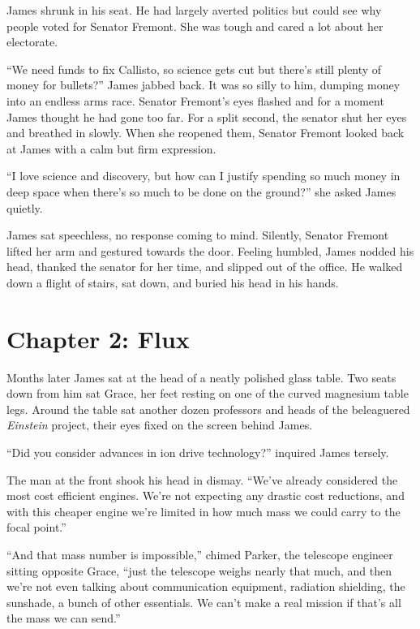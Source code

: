 \documentclass[12pt]{article} %
\begin{document}
James shrunk in his seat. He had largely averted politics but could see why people voted for Senator Fremont. She was tough and cared a lot about her electorate. 

``We need funds to fix Callisto, so science gets cut but there's still plenty of money for bullets?'' James jabbed back. It was so silly to him, dumping money into an endless arms race. Senator Fremont's eyes flashed and for a moment James thought he had gone too far. For a split second, the senator shut her eyes and breathed in slowly. When she reopened them, Senator Fremont looked back at James with a calm but firm expression.

``I love science and discovery, but how can I justify spending so much money in deep space when there's so much to be done on the ground?'' she asked James quietly.

James sat speechless, no response coming to mind. Silently, Senator Fremont lifted her arm and gestured towards the door. Feeling humbled, James nodded his head, thanked the senator for her time, and slipped out of the office. He walked down a flight of stairs, sat down, and buried his head in his hands.

\newpage
\section{Chapter 2: Flux}

Months later James sat at the head of a neatly polished glass table. Two seats down from him sat Grace, her feet resting on one of the curved magnesium table legs. Around the table sat another dozen professors and heads of the beleaguered \textit{Einstein} project, their eyes fixed on the screen behind James.

``Did you consider advances in ion drive technology?'' inquired James tersely.

The man at the front shook his head in dismay. ``We've already considered the most cost efficient engines. We're not expecting any drastic cost reductions, and with this cheaper engine we're limited in how much mass we could carry to the focal point.''

``And that mass number is impossible,'' chimed Parker, the telescope engineer sitting opposite Grace, ``just the telescope weighs nearly that much, and then we're not even talking about communication equipment, radiation shielding, the sunshade, a bunch of other essentials. We can't make a real mission if that's all the mass we can send.''
\end{document}
